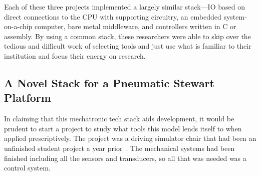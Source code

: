 \documentclass[english,12pt,a4paper,pdftex,eng,utf8]{aaltothesis}
\begin{document}
Each of these three projects implemented a largely similar stack---IO based on direct connections to the CPU with supporting circuitry, an embedded system-on-a-chip computer, bare metal middleware, and controllers written in C or assembly. By using a common stack, these researchers were able to skip over the tedious and difficult work of selecting tools and just use what is familiar to their institution and focus their energy on research.

\subsection{A Novel Stack for a Pneumatic Stewart Platform}\label{sec:stewart_platform}

In claiming that this mechatronic tech stack aids development, it would be prudent to start a project to study what tools this model lends itself to when applied prescriptively. The project was a driving simulator chair that had been an unfinished student project a year prior~\cite{Bjoerklund2023}. The mechanical systems had been finished including all the sensors and transducers, so all that was needed was a control system.
\end{document}
